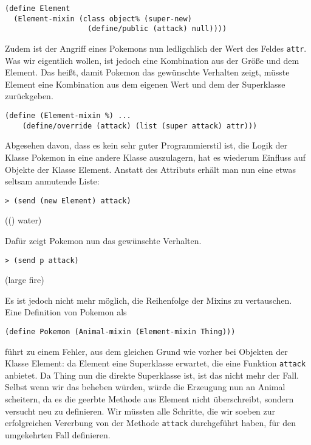 \begin{lstlisting}
(define Element 
  (Element-mixin (class object% (super-new)
                   (define/public (attack) null))))
\end{lstlisting}

Zudem ist der Angriff eines Pokemons nun ledligchlich der Wert des Feldes \texttt{attr}. 
% 
Was wir eigentlich wollen, ist jedoch eine Kombination aus der Größe und dem Element. Das heißt, damit Pokemon das gewünschte Verhalten zeigt, müsste Element eine Kombination aus dem eigenen Wert und dem der Superklasse zurückgeben.

\begin{lstlisting}
(define (Element-mixin %) ...
    (define/override (attack) (list (super attack) attr)))
\end{lstlisting}

Abgesehen davon, dass es kein sehr guter Programmierstil ist, die Logik der Klasse Pokemon in eine andere Klasse auszulagern, hat es wiederum Einfluss auf Objekte der Klasse Element. Anstatt des Attributs erhält man nun eine etwas seltsam anmutende Liste:

\begin{lstlisting}
> (send (new Element) attack)
\end{lstlisting}
{\rsymbol (() water)}

Dafür zeigt Pokemon nun das gewünschte Verhalten.
\begin{lstlisting}
> (send p attack)
\end{lstlisting}
{\rsymbol (large fire)}

Es ist jedoch nicht mehr möglich, die Reihenfolge der Mixins zu vertauschen. Eine Definition von Pokemon als

\begin{lstlisting}
(define Pokemon (Animal-mixin (Element-mixin Thing)))
\end{lstlisting}

führt zu einem Fehler, aus dem gleichen Grund wie vorher bei Objekten der Klasse Element: da Element eine Superklasse erwartet, die eine Funktion \texttt{attack} anbietet. Da Thing nun die direkte Superklasse ist, ist das nicht mehr der Fall. Selbst wenn wir das beheben würden, würde die Erzeugung nun an Animal scheitern, da es die geerbte Methode aus Element nicht überschreibt, sondern versucht neu zu definieren. Wir müssten alle Schritte, die wir soeben zur erfolgreichen Vererbung von der Methode \texttt{attack} durchgeführt haben, für den umgekehrten Fall definieren. 


